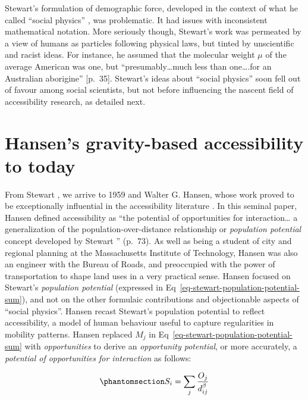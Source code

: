 \documentclass[
  10pt,
  letterpaper,
]{article}
\begin{document}
Stewart's formulation of demographic force, developed in the context of
what he called ``social physics'' \citep{stewartPrinciples1947}, was
problematic. It had issues with inconsistent mathematical notation. More
seriously though, Stewart's work was permeated by a view of humans as
particles following physical laws, but tinted by unscientific and racist
ideas. For instance, he assumed that the molecular weight \(\mu\) of the
average American was one, but ``presumably\ldots much less than
one\ldots.for an Australian aborigine'' {[}p.~35{]}. Stewart's ideas
about ``social physics'' soon fell out of favour among social
scientists, but not before influencing the nascent field of
accessibility research, as detailed next.

\section{Hansen's gravity-based accessibility to
today}\label{grav-to-today}

From Stewart \citep{stewartDemographicGravitationEvidence1948}, we
arrive to 1959 and Walter G. Hansen, whose work proved to be
exceptionally influential in the accessibility literature
\citep{hansen1959}. In this seminal paper, Hansen defined accessibility
as ``the potential of opportunities for interaction\ldots{} a
generalization of the population-over-distance relationship or
\emph{population potential} concept developed by Stewart
\citep{stewartDemographicGravitationEvidence1948}'' (p.~73). As well as
being a student of city and regional planning at the Massachusetts
Institute of Technology, Hansen was also an engineer with the Bureau of
Roads, and preoccupied with the power of transportation to shape land
uses in a very practical sense. Hansen \citep{hansen1959} focused on
Stewart's \citep{stewartDemographicGravitationEvidence1948}
\emph{population potential} (expressed in
Eq~\ref{eq-stewart-population-potential-sum}), and not on the other
formulaic contributions and objectionable aspects of ``social physics''.
Hansen \citep{hansen1959} recast Stewart's population potential to
reflect accessibility, a model of human behaviour useful to capture
regularities in mobility patterns. Hansen \citep{hansen1959} replaced
\(M_j\) in Eq~\ref{eq-stewart-population-potential-sum} with
\emph{opportunities} to derive an \emph{opportunity potential}, or more
accurately, a \emph{potential of opportunities for interaction} as
follows:

\begin{equation}\phantomsection\label{eq-accessibility}{
S_{i} = \sum_j \frac{O_j }{d_{ij}^\beta}
}\end{equation}
\end{document}
